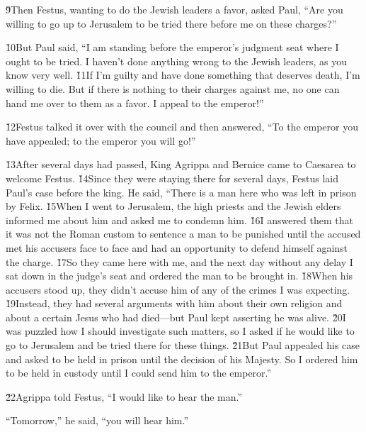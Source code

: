 \v{9}Then Festus, wanting to do the Jewish leaders a favor, asked Paul, ``Are you willing to go up to Jerusalem to be tried there before me on these charges?''

\v{10}But Paul said, ``I am standing before the emperor's judgment seat where I ought to be tried. I haven't done anything wrong to the Jewish leaders, as you know very well. \v{11}If I'm guilty and have done something that deserves death, I'm willing to die. But if there is nothing to their charges against me, no one can hand me over to them as a favor. I appeal to the emperor!''

\v{12}Festus talked it over with the council and then answered, ``To the emperor you have appealed; to the emperor you will go!''

\v{13}After several days had passed, King Agrippa and Bernice came to Caesarea to welcome Festus. \v{14}Since they were staying there for several days, Festus laid Paul's case before the king. He said, ``There is a man here who was left in prison by Felix. \v{15}When I went to Jerusalem, the high priests and the Jewish elders informed me about him and asked me to condemn him. \v{16}I answered them that it was not the Roman custom to sentence a man to be punished until the accused met his accusers face to face and had an opportunity to defend himself against the charge. \v{17}So they came here with me, and the next day without any delay I sat down in the judge's seat and ordered the man to be brought in. \v{18}When his accusers stood up, they didn't accuse him of any of the crimes I was expecting. \v{19}Instead, they had several arguments with him about their own religion and about a certain Jesus who had died---but Paul kept asserting he was alive. \v{20}I was puzzled how I should investigate such matters, so I asked if he would like to go to Jerusalem and be tried there for these things. \v{21}But Paul appealed his case and asked to be held in prison until the decision of his Majesty. So I ordered him to be held in custody until I could send him to the emperor.''

\v{22}Agrippa told Festus, ``I would like to hear the man.''

``Tomorrow,'' he said, ``you will hear him.''

